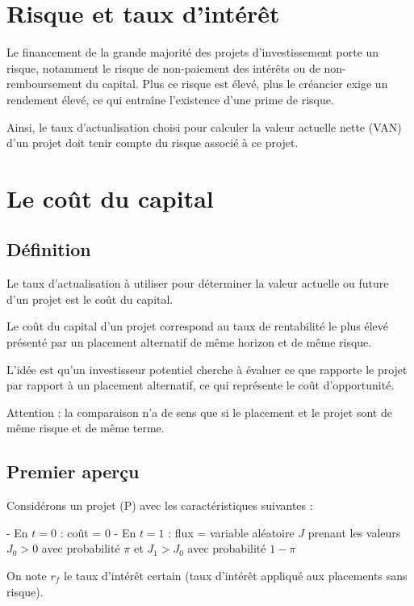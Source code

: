 \documentclass[a4paper, 12pt]{report}
\begin{document}
\section{Risque et taux d'intérêt}

Le financement de la grande majorité des projets d'investissement porte un risque, notamment le risque de non-paiement des intérêts ou de non-remboursement du capital. Plus ce risque est élevé, plus le créancier exige un rendement élevé, ce qui entraîne l'existence d'une prime de risque.

Ainsi, le taux d'actualisation choisi pour calculer la valeur actuelle nette (VAN) d'un projet doit tenir compte du risque associé à ce projet.

\section{Le coût du capital}

\subsection{Définition}

Le taux d'actualisation à utiliser pour déterminer la valeur actuelle ou future d'un projet est le coût du capital.

Le coût du capital d'un projet correspond au taux de rentabilité le plus élevé présenté par un placement alternatif de même horizon et de même risque.

L'idée est qu'un investisseur potentiel cherche à évaluer ce que rapporte le projet par rapport à un placement alternatif, ce qui représente le coût d'opportunité. 

Attention : la comparaison n'a de sens que si le placement et le projet sont de même risque et de même terme.

\subsection{Premier aperçu}

Considérons un projet (P) avec les caractéristiques suivantes :

- En \( t = 0 \) : coût = 0
- En \( t = 1 \) : flux = variable aléatoire \( J \) prenant les valeurs \( J_0 > 0 \) avec probabilité \( \pi \) et \( J_1 > J_0 \) avec probabilité \( 1 - \pi \)

On note \( r_f \) le taux d'intérêt certain (taux d'intérêt appliqué aux placements sans risque).
\end{document}
